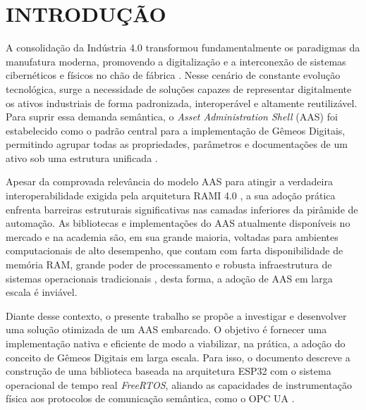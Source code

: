 \chapter*{INTRODUÇÃO}

A consolidação da Indústria 4.0 transformou fundamentalmente os paradigmas da manufatura moderna, promovendo a digitalização e a interconexão de sistemas cibernéticos e físicos no chão de fábrica \cite{kagermann2013}. Nesse cenário de constante evolução tecnológica, surge a necessidade de soluções capazes de representar digitalmente os ativos industriais de forma padronizada, interoperável e altamente reutilizável. Para suprir essa demanda semântica, o \textit{Asset Administration Shell} (AAS) foi estabelecido como o padrão central para a implementação de Gêmeos Digitais, permitindo agrupar todas as propriedades, parâmetros e documentações de um ativo sob uma estrutura unificada \cite{zhang2025, olaya2025}.

Apesar da comprovada relevância do modelo AAS para atingir a verdadeira interoperabilidade exigida pela arquitetura RAMI 4.0 \cite{plattform2016}, a sua adoção prática enfrenta barreiras estruturais significativas nas camadas inferiores da pirâmide de automação. As bibliotecas e implementações do AAS atualmente disponíveis no mercado e na academia são, em sua grande maioria, voltadas para ambientes computacionais de alto desempenho, que contam com farta disponibilidade de memória RAM, grande poder de processamento e robusta infraestrutura de sistemas operacionais tradicionais \cite{pribis2021}, desta forma, a adoção de AAS em larga escala é inviável. 

Diante desse contexto, o presente trabalho se propõe a investigar e desenvolver uma solução otimizada de um AAS embarcado. O objetivo é fornecer uma implementação nativa e eficiente de modo a viabilizar, na prática, a adoção do conceito de Gêmeos Digitais em larga escala. Para isso, o documento descreve a construção de uma biblioteca baseada na arquitetura ESP32 com o sistema operacional de tempo real \textit{FreeRTOS}, aliando as capacidades de instrumentação física aos protocolos de comunicação semântica, como o OPC UA \cite{opcfoundation2026}.